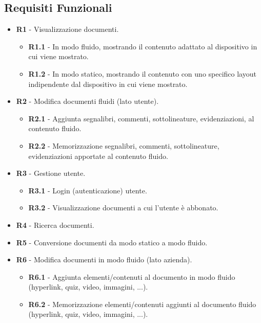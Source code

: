 \subsection{Requisiti Funzionali}
\begin{itemize}
    \item \textbf{R1} - Visualizzazione documenti.
    \begin{itemize}
        \item \textbf{R1.1} - In modo fluido, mostrando il contenuto adattato al dispositivo in cui viene mostrato.
        \item \textbf{R1.2} - In modo statico, mostrando il contenuto con uno specifico layout indipendente dal dispositivo in cui viene mostrato.
    \end{itemize}
    \item \textbf{R2} - Modifica documenti fluidi (lato utente).
    \begin{itemize}
        \item \textbf{R2.1} - Aggiunta segnalibri, commenti, sottolineature, evidenziazioni, al contenuto fluido.
        \item \textbf{R2.2} - Memorizzazione segnalibri, commenti, sottolineature, evidenziazioni apportate al contenuto fluido.
    \end{itemize}
    \item \textbf{R3} - Gestione utente.
    \begin{itemize}
        \item \textbf{R3.1} - Login (autenticazione) utente.
        \item \textbf{R3.2} - Visualizzazione documenti a cui l'utente è abbonato.
    \end{itemize}
    \item \textbf{R4} - Ricerca documenti.
    \item \textbf{R5} - Conversione documenti da modo statico a modo fluido.
    \item \textbf{R6} - Modifica documenti in modo fluido (lato azienda).
    \begin{itemize}
        \item \textbf{R6.1} - Aggiunta elementi/contenuti al documento in modo fluido (hyperlink, quiz, video, immagini, ...).
        \item \textbf{R6.2} - Memorizzazione elementi/contenuti aggiunti al documento fluido (hyperlink, quiz, video, immagini, ...).
    \end{itemize}
\end{itemize}

